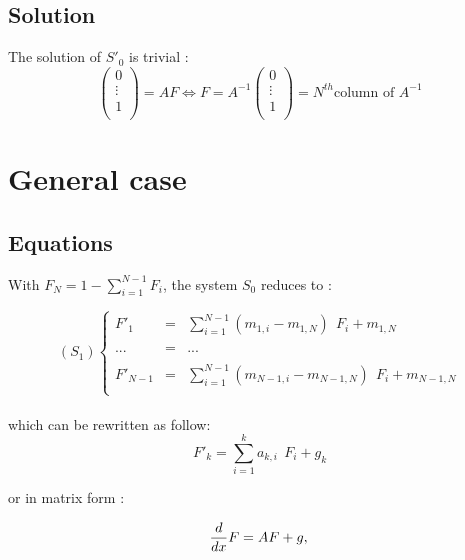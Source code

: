 \documentclass[a4paper,12pt]{article}
\begin{document}
\subsection{Solution}
The solution of $S'_0$ is trivial :
\begin{equation}
\begin{pmatrix}
0 \\ 
 \vdots\\
1\\ \end{pmatrix} = A F \Leftrightarrow F=A^{-1} \begin{pmatrix}
0 \\ 
 \vdots\\
1\\ \end{pmatrix} = N^{th} \text{column of } A^{-1}
\end{equation}

\section{ General case} 
 \subsection{Equations}
 With $F_N=1-\sum_{i=1}^{N-1} F_i$, the system $S_0$ reduces to :

$$(S_1)\left\lbrace
\begin{array}{lcl}
F'_1&=& \sum_{i=1}^{N-1} (m_{1,i} -   m_{1,N} ) \ \ F_i  +  m_{1,N}\\
 & & \\
... &=& ...\\
 & & \\
F'_{N-1} &=& \sum_{i=1}^{N-1} (m_{N-1,i}-m_{N-1,N}) \ \ F_i   +  m_{N-1,N}\\
\end{array}\right.$$
\\
which can be rewritten as follow:
\begin{equation}
 F'_{k} = \sum_{i=1}^{k} a_{k,i} \ \ F_i   +  g_k
 \label{eqM1}
\end{equation}


or in matrix form :


\begin{equation}
\frac{d}{dx}F=AF + g, \\
\label{eqM2}
\end{equation}
\end{document}
